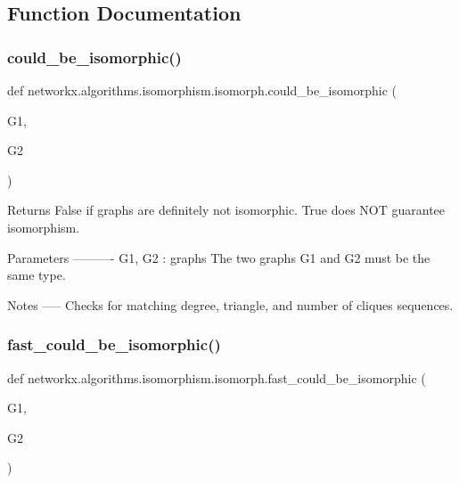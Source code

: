 \subsection{Function Documentation}
\mbox{\label{namespacenetworkx_1_1algorithms_1_1isomorphism_1_1isomorph_acd8e52946a8e1eb4edfa680004493abc}} 
\subsubsection{\texorpdfstring{could\+\_\+be\+\_\+isomorphic()}{could\_be\_isomorphic()}}
{\footnotesize\ttfamily def networkx.\+algorithms.\+isomorphism.\+isomorph.\+could\+\_\+be\+\_\+isomorphic (\begin{DoxyParamCaption}\item[{}]{G1,  }\item[{}]{G2 }\end{DoxyParamCaption})}

\begin{DoxyVerb}Returns False if graphs are definitely not isomorphic.
True does NOT guarantee isomorphism.

Parameters
----------
G1, G2 : graphs
   The two graphs G1 and G2 must be the same type.

Notes
-----
Checks for matching degree, triangle, and number of cliques sequences.
\end{DoxyVerb}
 \mbox{\label{namespacenetworkx_1_1algorithms_1_1isomorphism_1_1isomorph_a653f0e5f4f9bd1c131901c327bfc4f4a}} 
\subsubsection{\texorpdfstring{fast\+\_\+could\+\_\+be\+\_\+isomorphic()}{fast\_could\_be\_isomorphic()}}
{\footnotesize\ttfamily def networkx.\+algorithms.\+isomorphism.\+isomorph.\+fast\+\_\+could\+\_\+be\+\_\+isomorphic (\begin{DoxyParamCaption}\item[{}]{G1,  }\item[{}]{G2 }\end{DoxyParamCaption})}

